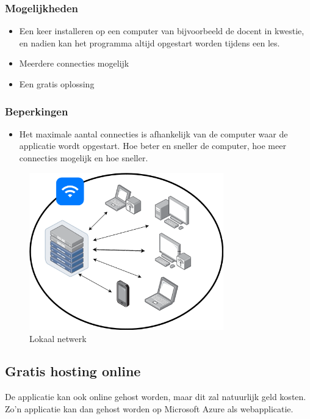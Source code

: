 \subsubsection{Mogelijkheden}
\begin{itemize}
    \item Een keer installeren op een computer van bijvoorbeeld de docent in kwestie, en nadien kan het programma altijd opgestart worden tijdens een les.
    \item Meerdere connecties mogelijk
    \item Een gratis oplossing
\end{itemize}
\subsubsection{Beperkingen}
\begin{itemize}
    \item Het maximale aantal connecties is afhankelijk van de computer waar de applicatie wordt opgestart. Hoe beter en sneller de computer, hoe meer connecties mogelijk en hoe sneller.
\end{itemize}

\begin{figure}
    \centering
    \includegraphics[width=0.75\textwidth]{./img/lokaal_netwerk}
    \caption{\label{fig:lokaal_netwerk} Lokaal netwerk}
\end{figure}

\subsection{Gratis hosting online}
De applicatie kan ook online gehost worden, maar dit zal natuurlijk geld kosten. Zo'n applicatie kan dan gehost worden op Microsoft Azure als webapplicatie.
